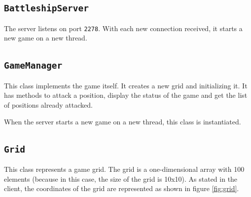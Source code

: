 \documentclass[a4paper, 12pt]{article}
\begin{document}
	\subsection{\texttt{BattleshipServer}}
	The server listens on port \texttt{2278}. With each new connection received, it starts a new game on a new thread.
	\subsection{\texttt{GameManager}}
	This class implements the game itself. It creates a new grid and initializing it. It has methods to attack a position, display the status of the game and get the list of positions already attacked.\par
	When the server starts a new game on a new thread, this class is instantiated.
	\subsection{\texttt{Grid}}
	This class represents a game grid. The grid is a one-dimensional array with 100 elements (because in this case, the size of the grid is 10x10). As stated in the client, the coordinates of the grid are represented as shown in figure \ref{fig:grid}.\par
\end{document}
